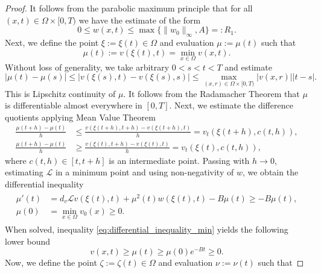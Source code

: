 \documentclass[11pt, a4paper]{article}
\theoremstyle{break}
\theoremstyle{break}
\theoremstyle{break}
\theoremstyle{break}
\theoremstyle{break}
\theoremstyle{break}
\theoremstyle{break}
\begin{document}
\begin{proof}
    It follows from the parabolic maximum principle that for all $(x, t) \in \Omega \times [0, T)$ we have the estimate of the form
    \begin{equation}
        \label{EQ:AprioriEstimate_V}
        0 \leq w(x, t) \leq \max\{\|w_0\|_\infty, A\} =: R_1.
    \end{equation}
    Next, we define the point $\xi := \xi(t) \in \Omega$ and evaluation $\mu := \mu(t)$ such that 
    \begin{equation*}
        \mu(t) := v(\xi(t), t) = \min_{x \in \Omega} v(x, t).
    \end{equation*}
    Without loss of generality, we take arbitrary $0 < s < t < T$ and estimate
    \begin{equation*}
        \left|\mu(t) - \mu(s)\right| \leq \left|v(\xi(s), t) - v(\xi(s), s)\right| \leq \max_{(x, r) \in \Omega \times [0, T)} |v(x, r)| |t-s|.
    \end{equation*}
    This is Lipschitz continuity of $\mu$. It follows from the Radamacher Theorem that $\mu$ is differentiable almost everywhere in $[0, T]$. Next, we estimate the difference quotients applying Mean Value Theorem
    \begin{align*}
        \frac{\mu(t+h) - \mu(t)}{h} &\leq \frac{v(\xi(t+h), t+h) - v(\xi(t + h), t)}{h} = v_t(\xi(t + h), c(t, h)), \\
        \frac{\mu(t+h) - \mu(t)}{h} &\geq \frac{v(\xi(t), t+h) - v(\xi(t), t)}{h} = v_t(\xi(t), c(t, h)),
    \end{align*}
    where $c(t,h) \in [t, t+h]$ is an intermediate point. Passing with $h \rightarrow 0$, estimating $\mathcal{L}$ in a minimum point and using non-negativity of $w$, we obtain the differential inequality
    \begin{align}
        \label{eq:differential_inequality_min}
        \begin{split}
            \mu'(t) &= d_v \mathcal{L} v(\xi(t), t) + \mu^2(t) w(\xi(t), t) - B \mu(t) \geq - B \mu(t), \\
            \mu(0) &= \min_{x \in \Omega} v_0(x) \geq 0.
        \end{split}
    \end{align}
    When solved, inequality \eqref{eq:differential_inequality_min} yields the following lower bound 
    \begin{equation*}
        v(x,t) \geq \mu(t) \geq \mu(0) e^{-B t} \geq 0.
    \end{equation*}
    Now, we define the point $\zeta := \zeta(t) \in \Omega$ and evaluation $\nu := \nu(t)$ such that

\end{proof}
\end{document}
